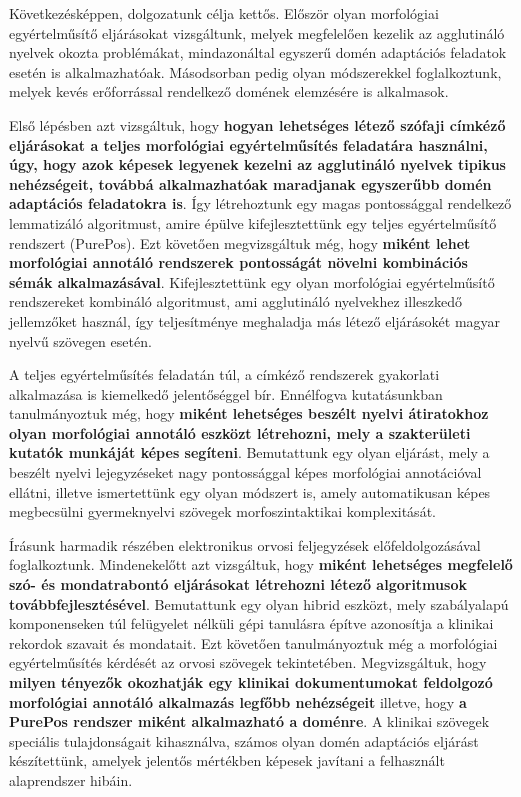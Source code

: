 Következésképpen, dolgozatunk célja kettős.
Először olyan morfológiai egyértelműsítő eljárásokat vizsgáltunk, melyek megfelelően kezelik az agglutináló nyelvek okozta problémákat, mindazonáltal egyszerű domén adaptációs feladatok esetén is alkalmazhatóak.
Másodsorban pedig olyan módszerekkel foglalkoztunk, melyek kevés erőforrással rendelkező domének elemzésére is alkalmasok.

Első lépésben azt vizsgáltuk, hogy \textbf{hogyan lehetséges létező szófaji címkéző eljárásokat a teljes morfológiai egyértelműsítés feladatára használni, úgy, hogy azok képesek legyenek kezelni az agglutináló nyelvek tipikus nehézségeit, továbbá alkalmazhatóak maradjanak egyszerűbb domén adaptációs feladatokra is}.
Így létrehoztunk egy magas pontossággal rendelkező lemmatizáló algoritmust, amire épülve kifejlesztettünk egy teljes egyértelműsítő rendszert (PurePos).
Ezt követően megvizsgáltuk még, hogy \textbf{miként lehet morfológiai annotáló rendszerek pontosságát növelni kombinációs sémák alkalmazásával}.
Kifejlesztettünk egy olyan morfológiai egyértelműsítő rendszereket kombináló algoritmust, ami agglutináló nyelvekhez illeszkedő jellemzőket használ, így teljesítménye meghaladja más létező eljárásokét magyar nyelvű szövegen esetén.

A teljes egyértelműsítés feladatán túl, a címkéző rendszerek gyakorlati alkalmazása is kiemelkedő jelentőséggel bír.
Ennélfogva kutatásunkban tanulmányoztuk még, hogy \textbf{miként lehetséges beszélt nyelvi átiratokhoz olyan morfológiai annotáló eszközt létrehozni, mely a szakterületi kutatók munkáját képes segíteni}.
Bemutattunk egy olyan eljárást, mely a beszélt nyelvi lejegyzéseket nagy pontossággal képes morfológiai annotációval ellátni, illetve ismertettünk egy olyan módszert is, amely automatikusan képes megbecsülni gyermeknyelvi szövegek morfoszintaktikai komplexitását.

Írásunk harmadik részében elektronikus orvosi feljegyzések előfeldolgozásával foglalkoztunk.
Mindenekelőtt azt vizsgáltuk, hogy \textbf{miként lehetséges megfelelő szó- és mondatrabontó eljárásokat létrehozni létező algoritmusok továbbfejlesztésével}.
Bemutattunk egy olyan hibrid eszközt, mely szabályalapú komponenseken túl felügyelet nélküli gépi tanulásra építve azonosítja a klinikai rekordok szavait és mondatait. 
Ezt követően tanulmányoztuk még a morfológiai egyértelműsítés kérdését az orvosi szövegek tekintetében.
Megvizsgáltuk, hogy \textbf{milyen tényezők okozhatják egy klinikai dokumentumokat feldolgozó morfológiai annotáló alkalmazás legfőbb nehézségeit} illetve, hogy \textbf{a PurePos rendszer miként alkalmazható a doménre}.
A klinikai szövegek speciális tulajdonságait kihasználva, számos olyan domén adaptációs eljárást készítettünk, amelyek jelentős mértékben képesek javítani a felhasznált alaprendszer hibáin.



